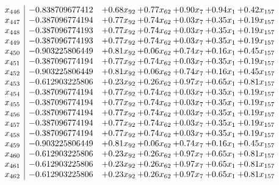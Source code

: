 \documentclass[8pt]{article}
\begin{document}
\[\begin{array}{c| c c@{\hskip 2pt} c@{\hskip 2pt} c@{\hskip 2pt} c@{\hskip 2pt} c@{\hskip 2pt} }
 x_{446}   &  -0.838709677412 & +  0.68 x_{92} & +  0.77 x_{62} & +  0.90 x_{7} & +  0.94 x_{1} & +  0.42 x_{157}\\
 x_{447}   &  -0.387096774194 & +  0.77 x_{92} & +  0.74 x_{62} & +  0.03 x_{7} & +  0.35 x_{1} & +  0.19 x_{157}\\
 x_{448}   &  -0.387096774193 & +  0.77 x_{92} & +  0.74 x_{62} & +  0.03 x_{7} & +  0.35 x_{1} & +  0.19 x_{157}\\
 x_{449}   &  -0.387096774193 & +  0.77 x_{92} & +  0.74 x_{62} & +  0.03 x_{7} & +  0.35 x_{1} & +  0.19 x_{157}\\
 x_{450}   &  -0.903225806449 & +  0.81 x_{92} & +  0.06 x_{62} & +  0.74 x_{7} & +  0.16 x_{1} & +  0.45 x_{157}\\
 x_{451}   &  -0.387096774194 & +  0.77 x_{92} & +  0.74 x_{62} & +  0.03 x_{7} & +  0.35 x_{1} & +  0.19 x_{157}\\
 x_{452}   &  -0.903225806449 & +  0.81 x_{92} & +  0.06 x_{62} & +  0.74 x_{7} & +  0.16 x_{1} & +  0.45 x_{157}\\
 x_{453}   &  -0.612903225806 & +  0.23 x_{92} & +  0.26 x_{62} & +  0.97 x_{7} & +  0.65 x_{1} & +  0.81 x_{157}\\
 x_{454}   &  -0.387096774194 & +  0.77 x_{92} & +  0.74 x_{62} & +  0.03 x_{7} & +  0.35 x_{1} & +  0.19 x_{157}\\
 x_{455}   &  -0.387096774194 & +  0.77 x_{92} & +  0.74 x_{62} & +  0.03 x_{7} & +  0.35 x_{1} & +  0.19 x_{157}\\
 x_{456}   &  -0.387096774194 & +  0.77 x_{92} & +  0.74 x_{62} & +  0.03 x_{7} & +  0.35 x_{1} & +  0.19 x_{157}\\
 x_{457}   &  -0.387096774194 & +  0.77 x_{92} & +  0.74 x_{62} & +  0.03 x_{7} & +  0.35 x_{1} & +  0.19 x_{157}\\
 x_{458}   &  -0.387096774194 & +  0.77 x_{92} & +  0.74 x_{62} & +  0.03 x_{7} & +  0.35 x_{1} & +  0.19 x_{157}\\
 x_{459}   &  -0.903225806449 & +  0.81 x_{92} & +  0.06 x_{62} & +  0.74 x_{7} & +  0.16 x_{1} & +  0.45 x_{157}\\
 x_{460}   &  -0.612903225806 & +  0.23 x_{92} & +  0.26 x_{62} & +  0.97 x_{7} & +  0.65 x_{1} & +  0.81 x_{157}\\
 x_{461}   &  -0.612903225806 & +  0.23 x_{92} & +  0.26 x_{62} & +  0.97 x_{7} & +  0.65 x_{1} & +  0.81 x_{157}\\
 x_{462}   &  -0.612903225806 & +  0.23 x_{92} & +  0.26 x_{62} & +  0.97 x_{7} & +  0.65 x_{1} & +  0.81 x_{157}\\

\end{array}\]
\end{document}
